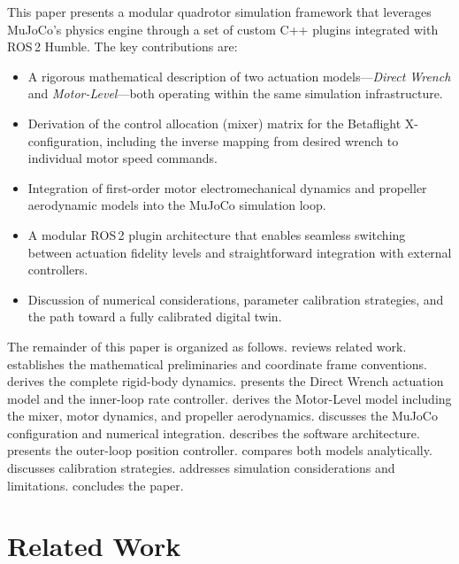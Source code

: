 \documentclass[journal]{IEEEtran}
\begin{document}
This paper presents a modular quadrotor simulation framework that leverages MuJoCo's physics engine through a set of custom C++ plugins integrated with ROS\,2 Humble. The key contributions are:

\begin{itemize}
  \item A rigorous mathematical description of two actuation models---\emph{Direct Wrench} and \emph{Motor-Level}---both operating within the same simulation infrastructure.
  \item Derivation of the control allocation (mixer) matrix for the Betaflight X-configuration, including the inverse mapping from desired wrench to individual motor speed commands.
  \item Integration of first-order motor electromechanical dynamics and propeller aerodynamic models into the MuJoCo simulation loop.
  \item A modular ROS\,2 plugin architecture that enables seamless switching between actuation fidelity levels and straightforward integration with external controllers.
  \item Discussion of numerical considerations, parameter calibration strategies, and the path toward a fully calibrated digital twin.
\end{itemize}

The remainder of this paper is organized as follows.  reviews related work.  establishes the mathematical preliminaries and coordinate frame conventions.  derives the complete rigid-body dynamics.  presents the Direct Wrench actuation model and the inner-loop rate controller.  derives the Motor-Level model including the mixer, motor dynamics, and propeller aerodynamics.  discusses the MuJoCo configuration and numerical integration.  describes the software architecture.  presents the outer-loop position controller.  compares both models analytically.  discusses calibration strategies.  addresses simulation considerations and limitations.  concludes the paper.


\section{Related Work}
\label{sec:related}
\end{document}
